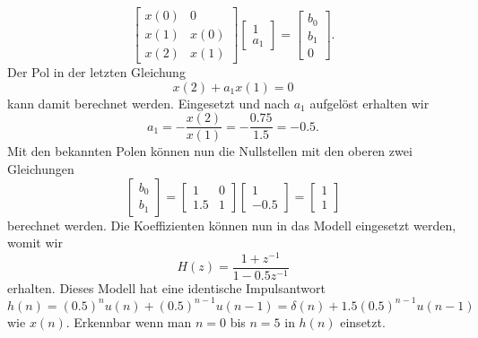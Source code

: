 \begin{beispiel}
\begin{enumerate}
\begin{equation}\left[\begin{array}{ll}
x(0) & 0 \\
x(1) & x(0) \\
x(2) & x(1)
\end{array}\right]\left[\begin{array}{c}
1 \\
a_1
\end{array}\right]=\left[\begin{array}{c}
b_0 \\
b_1\\
0
\end{array}\right].\end{equation}
Der Pol in der letzten Gleichung 
\begin{equation}
x(2)+a_1 x(1)=0
\end{equation}
kann damit berechnet werden.
Eingesetzt und nach $a_1$ aufgelöst erhalten wir
\begin{equation}
a_1=-\frac{x(2)}{x(1)}=
-\frac{0.75}{1.5}=
-0.5.
\end{equation}
Mit den bekannten Polen können nun die Nullstellen mit den oberen zwei Gleichungen 
\begin{equation}\left[\begin{array}{c}
b_0 \\
b_1
\end{array}\right]=\left[\begin{array}{cc}
1 & 0 \\
1.5 & 1
\end{array}\right]\left[\begin{array}{c}
1 \\
-0.5
\end{array}\right]=\left[\begin{array}{l}
1 \\
1
\end{array}\right]\end{equation}
berechnet werden.
Die Koeffizienten können nun in das Modell eingesetzt werden, womit wir
\begin{equation}
H(z)=\frac{1+z^{-1}}{1-0.5 z^{-1}}
\end{equation}
erhalten.
Dieses Modell hat eine identische Impulsantwort 
\begin{equation}
h(n)=(0.5)^{n} u(n)+(0.5)^{n-1} u(n-1)
=
\delta(n)+1.5(0.5)^{n-1} u(n-1)\end{equation}
wie $x(n)$.
Erkennbar wenn man $n=0$ bis $n=5$ in $h(n)$ einsetzt.
\begin{align*}

\end{align*}
\end{enumerate}
\end{beispiel}
